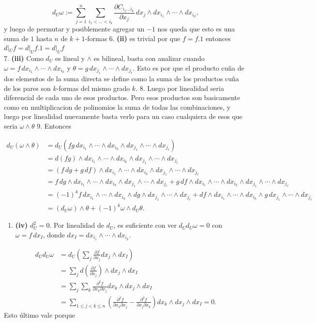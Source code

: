 \begin{bookproof}{}
\[
d_U\omega:=\sum_{j=1}^{n}  \sum_{i_{1}< \ldots<i_{k}}\frac{\partial C_{i_1\ldots i_k}}{\partial x_j}\,dx_j\wedge dx_{i_1}\wedge\cdots\wedge dx_{i_k},
\]
y luego de permutar y posiblemente agregar un $-1$ nos queda que esto es una suma de $1$ hasta $n$ de $k+1$-formas 6. \textbf{(ii)} es trivial por que $f=f.1$ entonces $d|_{U}f=d|_{U}f.1=d|_{U}f$\\
7. \textbf{(iii)} Como $d_U$ es lineal y $\wedge$ es bilineal, basta con analizar cuando $\omega=f\,dx_{i_1}\wedge\cdots\wedge dx_{i_k}$ y $\theta=g\,dx_{j_1}\wedge\cdots\wedge dx_{j_\ell}$. Esto es por que el producto cuña de dos elementos de la suma directa se define como la suma de los productos cuña de los pares son $k$-formas del mismo grado $k$. 8. Luego por linealidad seria diferencial de cada uno de esos productos. Pero esos productos son basicamente como en multiplicacion de polinomios la suma de todas las combinaciones, y luego por linealidad nuevamente basta verlo para un caso cualquiera de esos que seria $\omega\wedge\theta$ 9. Entonces

\[
\begin{aligned}d_U(\omega\wedge\theta)& =d_U(fg\,dx_{i_1}\wedge\cdots\wedge dx_{i_k}\wedge dx_{j_1}\wedge\cdots\wedge dx_{j_\ell})\\ & =d(fg)\wedge dx_{i_1}\wedge\cdots\wedge dx_{i_k}\wedge dx_{j_1}\wedge\cdots\wedge dx_{j_\ell}\\&=(f\,dg+g\,df)\wedge dx_{i_1}\wedge\cdots\wedge dx_{i_k}\wedge dx_{j_1}\wedge\cdots\wedge dx_{j_\ell}\\& =f\,dg\wedge dx_{i_1}\wedge\cdots\wedge dx_{i_k}\wedge dx_{j_1}\wedge\cdots\wedge dx_{j_\ell}+g\,df\wedge dx_{i_1}\wedge\cdots\wedge dx_{i_k}\wedge dx_{j_1}\wedge\cdots\wedge dx_{j_\ell}\\&=(-1)^k f\,dx_{i_1}\wedge\cdots\wedge dx_{i_k}\wedge dg\wedge dx_{j_1}\wedge\cdots\wedge dx_{j_\ell}+df\wedge dx_{i_1}\wedge\cdots\wedge dx_{i_k}\wedge g\,dx_{j_1}\wedge\cdots\wedge dx_{j_\ell}\\&=(d_U\omega)\wedge\theta+(-1)^k\omega\wedge d_U\theta.\end{aligned}
\]
\begin{enumerate}[start=10]
\item \textbf{(iv)} $d_U^2=0$. Por linealidad de $d_U$, es suficiente con ver $d_Ud_U\omega=0$ con $\omega=f\,dx_I$, donde $dx_I=dx_{i_1}\wedge\cdots\wedge dx_{i_k}$.
\end{enumerate}
\[
\begin{aligned}d_Ud_U\omega&=d_U\left(\sum_j\frac{\partial f}{\partial x_j}dx_j\wedge dx_I\right)\\&=\sum_j d\left(\frac{\partial f}{\partial x_j}\right)\wedge dx_j\wedge dx_I\\&=\sum_j\sum_k\frac{\partial^2 f}{\partial x_k\partial x_j}dx_k\wedge dx_j\wedge dx_I\\&=\sum_{1\le j<k\le n}\left(\frac{\partial^2 f}{\partial x_k\partial x_j}-\frac{\partial^2 f}{\partial x_j\partial x_k}\right)dx_k\wedge dx_j\wedge dx_I=0.\end{aligned}
\]
Esto último vale porque


\end{bookproof}
